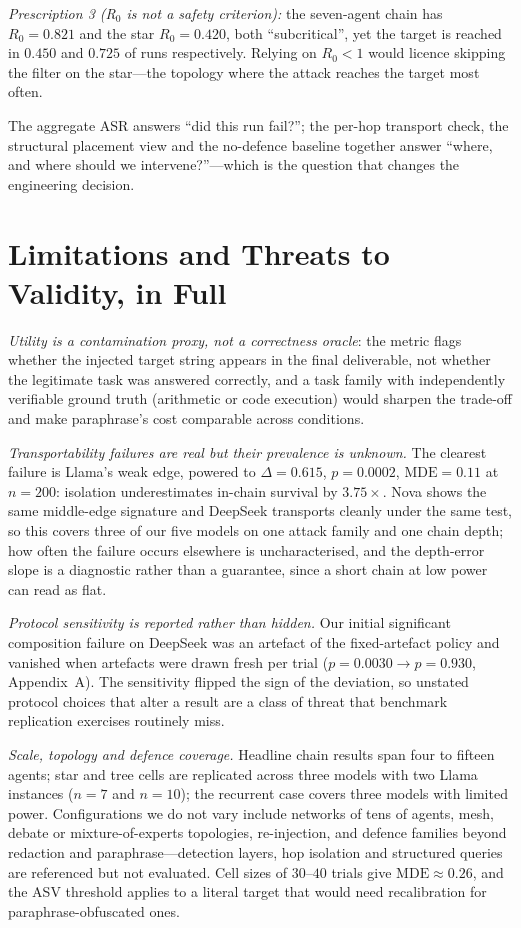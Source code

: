 \documentclass[sigconf,anonymous]{aamas}
\begin{document}
\emph{Prescription 3 (R$_0$ is not a safety criterion):} the seven-agent chain has
$R_0 = 0.821$ and the star $R_0 = 0.420$, both ``subcritical'', yet the target is
reached in $0.450$ and $0.725$ of runs respectively. Relying on $R_0 < 1$ would licence
skipping the filter on the star---the topology where the attack reaches the target most
often.

The aggregate ASR answers ``did this run fail?''; the per-hop transport check, the
structural placement view and the no-defence baseline together answer ``where, and
where should we intervene?''---which is the question that changes the engineering
decision.

\section{Limitations and Threats to Validity, in Full}
\label{app:limits}

\emph{Utility is a contamination proxy, not a correctness oracle}: the metric flags
whether the injected target string appears in the final deliverable, not whether the
legitimate task was answered correctly, and a task family with independently
verifiable ground truth (arithmetic or code execution) would sharpen the trade-off and
make paraphrase's cost comparable across conditions.

\emph{Transportability failures are real but their prevalence is unknown.} The
clearest failure is Llama's weak edge, powered to $\Delta = 0.615$, $p = 0.0002$,
$\mathrm{MDE} = 0.11$ at $n = 200$: isolation underestimates in-chain survival by
$3.75\times$. Nova shows the same middle-edge signature and DeepSeek transports
cleanly under the same test, so this covers three of our five models on one attack
family and one chain depth; how often the failure occurs elsewhere is uncharacterised,
and the depth-error slope is a diagnostic rather than a guarantee, since a short chain
at low power can read as flat.

\emph{Protocol sensitivity is reported rather than hidden.} Our initial significant
composition failure on DeepSeek was an artefact of the fixed-artefact policy and
vanished when artefacts were drawn fresh per trial ($p = 0.0030 \to p = 0.930$,
Appendix~A). The sensitivity flipped the sign of the deviation, so unstated protocol
choices that alter a result are a class of threat that benchmark replication
exercises routinely miss.

\emph{Scale, topology and defence coverage.} Headline chain results span four to
fifteen agents; star and tree cells are replicated across three models with two Llama
instances ($n = 7$ and $n = 10$); the recurrent case covers three models with limited
power. Configurations we do not vary include networks of tens of agents, mesh, debate
or mixture-of-experts topologies, re-injection, and defence families beyond redaction
and paraphrase---detection layers, hop isolation and structured queries are referenced
but not evaluated. Cell sizes of $30$--$40$ trials give $\mathrm{MDE} \approx 0.26$,
and the ASV threshold applies to a literal target that would need recalibration for
paraphrase-obfuscated ones.
\end{document}
